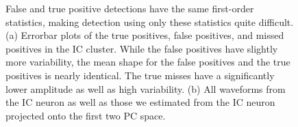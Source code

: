 \begin{center}
\begin{figure}
\begin{subfigure}[b]{.5\textwidth}
\caption{}
\label{fig:ICold}
\end{subfigure}
\caption{False and true positive detections have the same first-order statistics, making detection using only these statistics quite difficult.  (a)
 Errorbar plots of the true positives, false positives, and missed positives  in the IC cluster.  While the false positives have slightly more variability, the mean shape for the false positives and the true positives is nearly identical.  The true misses have a significantly lower amplitude as well as high variability. (b) All waveforms from the IC neuron as well as those we estimated from the IC neuron projected onto the first two PC space.} \label{fig:IC-PCA}
\end{figure}
\end{center}




